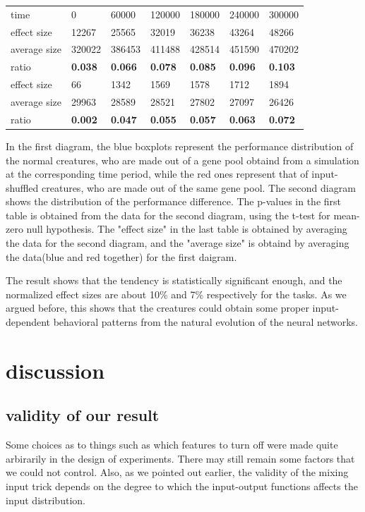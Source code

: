 \documentclass{article}
\numberwithin{equation}{section}
\begin{document}
\begin{table}[htb]
\begin{tabular}{lllllll}
time & 0 & 60000 & 120000 & 180000&240000&300000 \\
effect size& 12267& 25565& 32019& 36238& 43264& 48266 \\
average size& 320022&386453&411488&428514&451590&470202\\
ratio& \bf{0.038}& \bf{0.066}& \bf{0.078}& \bf{0.085}& \bf{0.096}& \bf{0.103}\\
effect size& 66& 1342& 1569& 1578& 1712& 1894  \\
average size& 29963& 28589& 28521& 27802& 27097& 26426\\
ratio& \bf{0.002}& \bf{0.047}& \bf{0.055}& \bf{0.057}& \bf{0.063}& \bf{0.072}  
  
\end{tabular}
\end{table}
In the first diagram, the blue boxplots represent the performance distribution of the normal creatures, who are made out of a gene pool obtaind from a simulation at the corresponding time period, while the red ones represent that  of input-shuffled creatures, who are made out of the same gene pool. The second diagram shows the distribution of the performance difference. The p-values in the first table is obtained from the data for the second diagram, using the t-test for mean-zero null hypothesis. The "effect size" in the last table is obtained by averaging the data for the second diagram, and the "average size" is obtaind by averaging the data(blue and red together) for the first daigram. 
  
The result shows that the tendency is statistically significant enough,
and the normalized effect sizes are about 10\% and 7\% respectively for the tasks. 
As we argued before, this shows that the creatures could obtain some proper input-dependent behavioral patterns from the natural evolution of the neural networks. 


\section{discussion}
\subsection{validity of our result}
Some choices as to things such as which features to turn off were made quite arbirarily in the design of experiments. There may still remain some factors that we could not control. Also, as we pointed out earlier, the validity of the mixing input trick depends on the degree to which the input-output functions affects the input distribution. 
\end{document}
